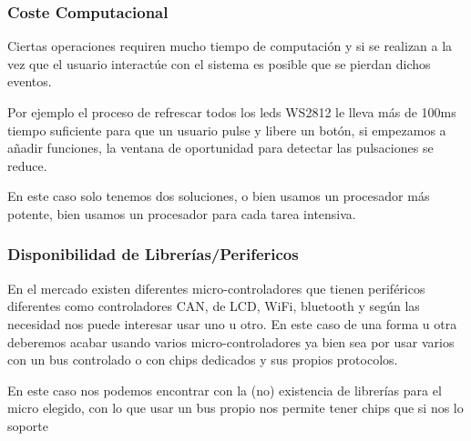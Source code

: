 \subsubsection{Coste Computacional}
Ciertas operaciones requiren mucho tiempo de computación y si se realizan a la vez que el usuario interactúe con
el sistema es posible que se pierdan dichos eventos.

Por ejemplo el proceso de refrescar todos los leds WS2812 le lleva más de 100ms tiempo suficiente para que un
usuario pulse y libere un botón, si empezamos a añadir funciones, la ventana de oportunidad para detectar las
pulsaciones se reduce.

En este caso solo tenemos dos soluciones, o bien usamos un procesador más potente, bien usamos un procesador
para cada tarea intensiva.

\subsubsection{Disponibilidad de Librerías/Perifericos}
En el mercado existen diferentes micro-controladores que tienen periféricos diferentes como controladores CAN,
de LCD, WiFi, bluetooth y según las necesidad nos puede interesar usar uno u otro. En este caso de una forma u
otra deberemos acabar usando varios micro-controladores ya bien sea por usar varios con un bus controlado o con
chips dedicados y sus propios protocolos.

En este caso nos podemos encontrar con la (no) existencia de librerías para el micro elegido, con lo que usar
un bus propio nos permite tener chips que si nos lo soporte
